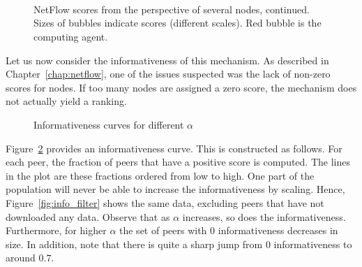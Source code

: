 \documentclass[a4paper,11pt]{book}
\theoremstyle{definition}
\begin{document}
\begin{figure}[ht]
    \ContinuedFloat
    \centering
        \subfloat{        }
        \subfloat{        } \\

        \subfloat{        } 
        \subfloat{        } \\

        \addtocounter{subfigure}{-1}
        \addtocounter{subfigure}{-1}
        \addtocounter{subfigure}{-1}
        \addtocounter{subfigure}{-1}

         \\

    \caption{NetFlow scores from the perspective of several nodes, continued.\\
             Sizes of bubbles indicate scores (different scales). Red bubble is the computing agent.}

    \label{fig:nf_alpha_comparison_2}
\end{figure}

Let us now consider the informativeness of this mechanism. As described in Chapter~\ref{chap:netflow},
one of the issues suspected was the lack of non-zero scores for nodes. If too many nodes are assigned
a zero score, the mechanism does not actually yield a ranking. 

\begin{figure}[ht]
    \centering
    
    \caption{Informativeness curves for different $\alpha$}
    \label{fig:info}
\end{figure}

Figure~\ref{fig:info} provides an informativeness curve. This is constructed as follows. For each
peer, the fraction of peers that have a positive score is computed. The lines in the plot
are these fractions ordered from low to high. One part of the population will never be able
to increase the informativeness by scaling. Hence, Figure~\ref{fig:info_filter} shows the same
data, excluding peers that have not downloaded any data. Observe that as $\alpha$ increases,
so does the informativeness. Furthermore, for higher $\alpha$ the set of peers with $0$ 
informativeness decreases in size. In addition, note that there is quite a sharp jump from 
$0$ informativeness to around $0.7$.
\end{document}
